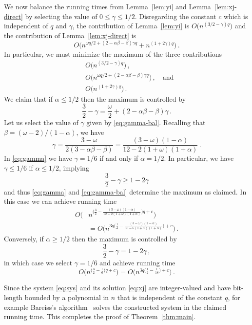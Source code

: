 \documentclass{amsart}
\begin{document}
We now balance the running times from Lemma~\ref{lem:yi} 
and Lemma~\ref{lem:xj-direct} by selecting the value of 
$0\leq\gamma\leq 1/2$. Disregarding the constant $c$ which
is independent of $q$ and $\gamma$, the contribution
of Lemma~\ref{lem:yi} is $O\bigl(n^{(3/2-\gamma)q}\bigr)$ 
and the contribution of Lemma~\ref{lem:xj-direct} is 
\[
O\bigl(n^{\omega q/2+(2-\alpha\beta-\beta)\gamma q}+n^{(1+2\gamma)q}\bigr)\,.
\]
In particular, we must minimize the maximum of the three contributions
\[
\begin{split}
&O\bigl(n^{(3/2-\gamma)q}\bigr)\,,\\
&O\bigl(n^{\omega q/2+(2-\alpha\beta-\beta)\gamma q}\bigr)\,,\quad\text{and}\\
&O\bigl(n^{(1+2\gamma)q}\bigr)\,.
\end{split}
\]
We claim that if $\alpha\leq 1/2$ then the maximum is controlled by
\begin{equation}
\label{eq:gamma-bal}
\frac{3}{2}-\gamma=\frac{\omega}{2}+(2-\alpha\beta-\beta)\gamma\,.
\end{equation}
Let us select the value of $\gamma$ given by \eqref{eq:gamma-bal}.
Recalling that $\beta=(\omega-2)/(1-\alpha)$, we have
\begin{equation}
\label{eq:gamma}
\gamma
=\frac{3-\omega}{2(3-\alpha\beta-\beta)}
=\frac{(3-\omega)(1-\alpha)}{12-2(1+\omega)(1+\alpha)}\,.
\end{equation}
In \eqref{eq:gamma} we have $\gamma=1/6$ if and only if $\alpha=1/2$.
In particular, we have $\gamma\leq 1/6$ if $\alpha\leq 1/2$, implying
\[
\frac{3}{2}-\gamma\geq 1-2\gamma
\]
and thus \eqref{eq:gamma} and \eqref{eq:gamma-bal} determine the maximum
as claimed. In this case we can achieve running time
\[
\begin{split}
O\biggl(&n^{\bigl(\frac{3}{2}-\frac{(3-\omega)(1-\alpha)}{12-2(1+\omega)(1+\alpha)}\bigr)q+c}\biggr)\\
&=O\biggl(n^{3q\bigl(\frac{1}{2}-\frac{(3-\omega)(1-\alpha)}{36-6(1+\omega)(1+\alpha)}\bigr)+c}\biggl)\,.
\end{split}
\]
Conversely, if $\alpha\geq 1/2$ then the maximum is controlled by
\[
\frac{3}{2}-\gamma=1-2\gamma\,,
\]
in which case we select $\gamma=1/6$ and achieve running time
\[
O\biggr(n^{\bigl(\frac{3}{2}-\frac{1}{6}\bigr)q+c}\biggr)
=O\biggl(n^{3q\bigl(\frac{1}{2}-\frac{1}{18}\bigr)+c}\biggr)\,.
\]

Since the system \eqref{eq:sys} and its solution \eqref{eq:xj} are 
integer-valued and have bit-length bounded by a polynomial in $n$
that is independent of the constant $q$, for example Bareiss's
algorithm~\cite{B68} solves the constructed system in 
the claimed running time.
This completes the proof of Theorem~\ref{thm:main}.
\end{document}
